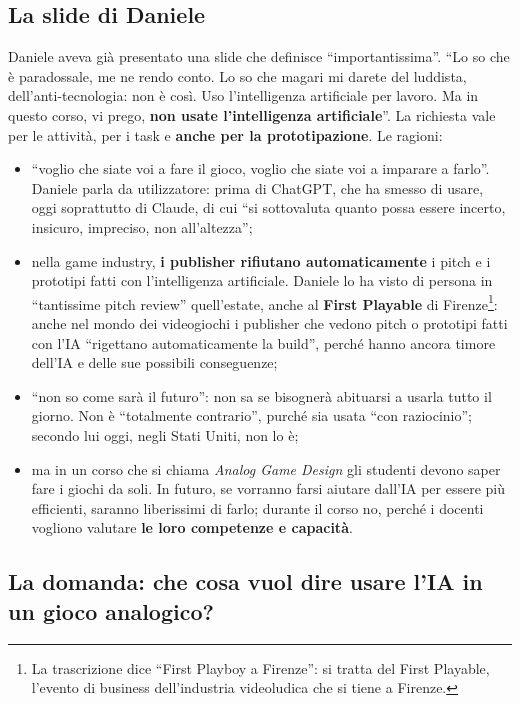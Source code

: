 \subsection{La slide di Daniele}

Daniele aveva già presentato una slide che definisce ``importantissima''. ``Lo so
che è paradossale, me ne rendo conto. Lo so che magari mi darete del luddista,
dell'anti-tecnologia: non è così. Uso l'intelligenza artificiale per lavoro. Ma
in questo corso, vi prego, \textbf{non usate l'intelligenza artificiale}''. La
richiesta vale per le attività, per i task e \textbf{anche per la
prototipazione}. Le ragioni:
\begin{itemize}
  \item ``voglio che siate voi a fare il gioco, voglio che siate voi a imparare a
        farlo''. Daniele parla da utilizzatore: prima di ChatGPT, che ha smesso
        di usare, oggi soprattutto di Claude, di cui ``si sottovaluta quanto
        possa essere incerto, insicuro, impreciso, non all'altezza'';
  \item nella game industry, \textbf{i publisher rifiutano automaticamente} i
        pitch e i prototipi fatti con l'intelligenza artificiale. Daniele lo ha
        visto di persona in ``tantissime pitch review'' quell'estate, anche al
        \textbf{First Playable} di Firenze\footnote{La trascrizione dice ``First
        Playboy a Firenze'': si tratta del First Playable, l'evento di business
        dell'industria videoludica che si tiene a Firenze.}: anche nel mondo dei
        videogiochi i publisher che vedono pitch o prototipi fatti con l'IA
        ``rigettano automaticamente la build'', perché hanno ancora timore
        dell'IA e delle sue possibili conseguenze;
  \item ``non so come sarà il futuro'': non sa se bisognerà abituarsi a usarla
        tutto il giorno. Non è ``totalmente contrario'', purché sia usata ``con
        raziocinio''; secondo lui oggi, negli Stati Uniti, non lo è;
  \item ma in un corso che si chiama \emph{Analog Game Design} gli studenti devono
        saper fare i giochi da soli. In futuro, se vorranno farsi aiutare
        dall'IA per essere più efficienti, saranno liberissimi di farlo; durante
        il corso no, perché i docenti vogliono valutare \textbf{le loro
        competenze e capacità}.
\end{itemize}

\subsection{La domanda: che cosa vuol dire usare l'IA in un gioco analogico?}

